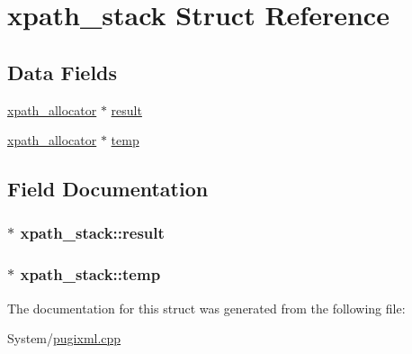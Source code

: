 \hypertarget{structxpath__stack}{\section{xpath\-\_\-stack Struct Reference}
\label{structxpath__stack}
}
\subsection*{Data Fields}
\begin{DoxyCompactItemize}
\item 
\hyperlink{classxpath__allocator}{xpath\-\_\-allocator} $\ast$ \hyperlink{structxpath__stack_adce164b779cbb3d1bc093a772067ea7e}{result}
\item 
\hyperlink{classxpath__allocator}{xpath\-\_\-allocator} $\ast$ \hyperlink{structxpath__stack_a48edd585dfb910c6c016559f07fea0d8}{temp}
\end{DoxyCompactItemize}


\subsection{Field Documentation}
\hypertarget{structxpath__stack_adce164b779cbb3d1bc093a772067ea7e}{
\subsubsection[{result}]{$\ast$ xpath\-\_\-stack\-::result}}\label{structxpath__stack_adce164b779cbb3d1bc093a772067ea7e}
\hypertarget{structxpath__stack_a48edd585dfb910c6c016559f07fea0d8}{
\subsubsection[{temp}]{$\ast$ xpath\-\_\-stack\-::temp}}\label{structxpath__stack_a48edd585dfb910c6c016559f07fea0d8}


The documentation for this struct was generated from the following file\-:\begin{DoxyCompactItemize}
\item 
System/\hyperlink{pugixml_8cpp}{pugixml.\-cpp}\end{DoxyCompactItemize}
